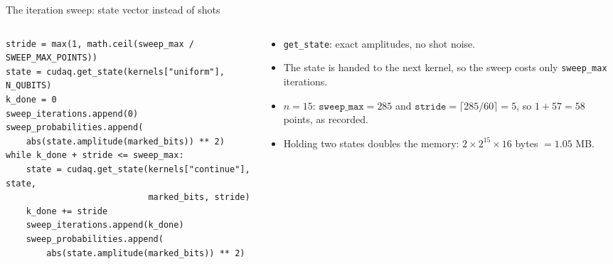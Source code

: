 \documentclass[aspectratio=169,11pt]{beamer}
\begin{document}
\begin{frame}[fragile]{The iteration sweep: state vector instead of shots}
  \begin{columns}[T]
    \begin{column}{0.58\textwidth}
\begin{lstlisting}
stride = max(1, math.ceil(sweep_max / SWEEP_MAX_POINTS))
state = cudaq.get_state(kernels["uniform"], N_QUBITS)
k_done = 0
sweep_iterations.append(0)
sweep_probabilities.append(
    abs(state.amplitude(marked_bits)) ** 2)
while k_done + stride <= sweep_max:
    state = cudaq.get_state(kernels["continue"], state,
                            marked_bits, stride)
    k_done += stride
    sweep_iterations.append(k_done)
    sweep_probabilities.append(
        abs(state.amplitude(marked_bits)) ** 2)
\end{lstlisting}
    \end{column}
    \begin{column}{0.39\textwidth}
      \small
      \begin{itemize}
        \item \texttt{get\_state}: exact amplitudes, no shot noise.
        \item The state is handed to the next kernel, so the sweep costs only \texttt{sweep\_max} iterations.
        \item $n = 15$: $\texttt{sweep\_max} = 285$ and $\texttt{stride} = \lceil285/60\rceil = 5$, so $1 + 57 = 58$ points, as recorded.
        \item Holding two states doubles the memory: $2\times2^{15}\times16$ bytes $= 1.05$ MB.
      \end{itemize}
    \end{column}
  \end{columns}
\end{frame}
\end{document}
